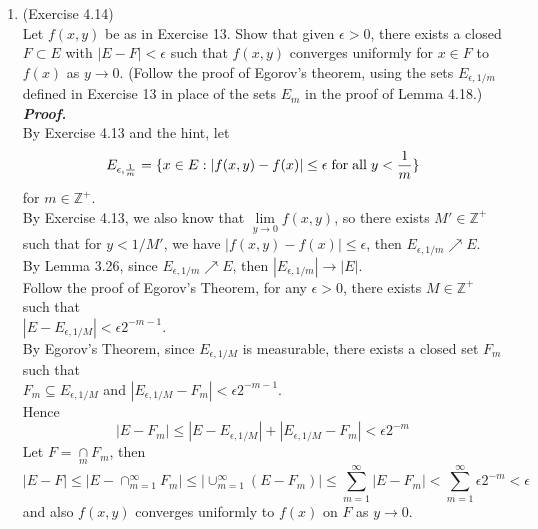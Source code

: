 \documentclass[a4paper,11pt]{article}
\begin{document}
\begin{enumerate}
\item (Exercise 4.14)\\
Let $f(x,y)$ be as in Exercise 13. Show that given $\epsilon > 0$, there exists a closed $F \subset E$ with $|E - F| < \epsilon$ such that $f(x,y)$ converges uniformly for $x \in F$ to $f(x)$ as $y \to 0$. (Follow the proof of Egorov's theorem, using the sets $E_{\epsilon, 1/m}$ defined in Exercise 13 in place of the sets $E_m$ in the proof of Lemma 4.18.)\\
\newline
\textit{\textbf {Proof.}}\\
By Exercise 4.13 and the hint, let
$$E_{\epsilon, \frac{1}{m}} = \{ x \in E : |f(x,y) - f(x)| \leq \epsilon \hspace{0.1cm} \mathrm{for} \hspace{0.1cm} \mathrm{all} \hspace{0.1cm} y < \frac{1}{m}  \}$$ for $m \in \mathbb{Z}^+$.\\
By Exercise 4.13, we also know that $\underset{y \to 0}{\lim} f(x,y)$, so there exists $M' \in \mathbb{Z}^+$ such that for $y < 1/M'$, we have $|f(x,y) - f(x)| \leq \epsilon$, then $E_{\epsilon, 1/m} \nearrow E$.\\
By Lemma 3.26, since $E_{\epsilon, 1/m} \nearrow E$, then $|E_{\epsilon, 1/m}| \to |E|$.\\
Follow the proof of Egorov's Theorem, for any $\epsilon > 0$, there exists $M \in \mathbb{Z}^+$ such that \\$|E - E_{\epsilon, 1/M}| < \epsilon 2^{-m-1}$.\\
By Egorov's Theorem, since $E_{\epsilon,1/M}$ is measurable, there exists a closed set $F_m$ such that \\$F_m \subseteq E_{\epsilon,1/M}$ and $|E_{\epsilon,1/M} - F_m| < \epsilon 2^{-m-1}$.\\
Hence
$$|E - F_m| \leq |E - E_{\epsilon,1/M}| + |E_{\epsilon, 1/M} - F_m| < \epsilon 2^{-m}$$
Let $F = \underset{m}{\cap} F_m$, then
$$|E-F| \leq |E - \cap_{m=1}^{\infty} F_m| \leq | \cup_{m=1}^{\infty} (E - F_m)| \leq \sum_{m=1}^{\infty}|E - F_m| < \sum_{m=1}^{\infty} \epsilon 2^{-m} < \epsilon$$
and also $f(x,y)$ converges uniformly to $f(x)$ on $F$ as $y \to 0$.\\




\end{enumerate}
\end{document}

